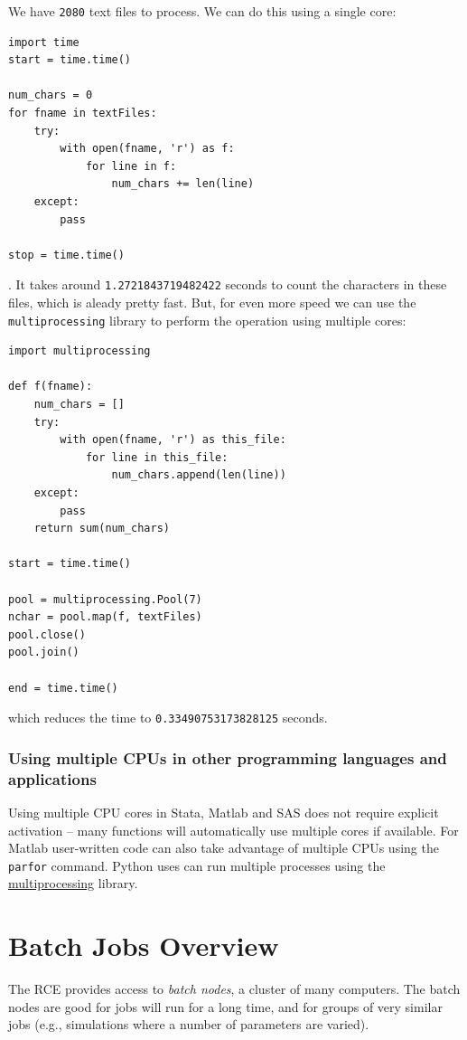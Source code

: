 \documentclass[11pt]{article}
\begin{document}
We have \texttt{2080} text files to process. We can do this using a single core:
\begin{verbatim}
import time
start = time.time()

num_chars = 0
for fname in textFiles:
    try:
        with open(fname, 'r') as f:
            for line in f:
                num_chars += len(line)
    except:
        pass

stop = time.time()
\end{verbatim}
. It takes around \texttt{1.2721843719482422} seconds to count the characters in these files, which is aleady pretty fast. But, for even more speed we can use the \texttt{multiprocessing} library to perform the operation using multiple cores:
\begin{verbatim}
import multiprocessing

def f(fname):
    num_chars = []
    try:
        with open(fname, 'r') as this_file:
            for line in this_file:
                num_chars.append(len(line))
    except:
        pass
    return sum(num_chars)

start = time.time()

pool = multiprocessing.Pool(7)
nchar = pool.map(f, textFiles)
pool.close()
pool.join()

end = time.time()
\end{verbatim}
which reduces the time to \texttt{0.33490753173828125} seconds.




\subsubsection{Using multiple CPUs in other programming languages and applications}
\label{sec:orgf068a57}
Using multiple CPU cores in Stata, Matlab and SAS does not require explicit activation -- many functions will automatically use multiple cores if available. For Matlab user-written code can also take advantage of multiple CPUs using the \texttt{parfor} command. Python uses can run multiple processes using the \href{https://docs.python.org/2/library/multiprocessing.html}{multiprocessing} library.

\section{Batch Jobs Overview}
\label{sec:org4d3b0d6}
The RCE provides access to \emph{batch nodes}, a cluster of many computers. The batch nodes are good for jobs will run for a long time, and for groups of very similar jobs (e.g., simulations where a number of parameters are varied).
\end{document}
